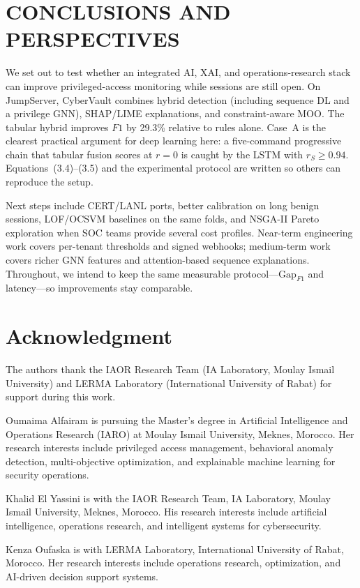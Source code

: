 \documentclass{ieeeaccess}
\begin{document}
\section{CONCLUSIONS AND PERSPECTIVES}
\label{sec:conclusion}

We set out to test whether an integrated AI, XAI, and operations-research stack can improve privileged-access monitoring while sessions are still open. On JumpServer, CyberVault combines hybrid detection (including sequence DL and a privilege GNN), SHAP/LIME explanations, and constraint-aware MOO. The tabular hybrid improves $F1$ by 29.3\% relative to rules alone. Case~A is the clearest practical argument for deep learning here: a five-command progressive chain that tabular fusion scores at $r{=}0$ is caught by the LSTM with $r_S\geq 0.94$. Equations~(3.4)--(3.5) and the experimental protocol are written so others can reproduce the setup.

Next steps include CERT/LANL ports, better calibration on long benign sessions, LOF/OCSVM baselines on the same folds, and NSGA-II Pareto exploration when SOC teams provide several cost profiles. Near-term engineering work covers per-tenant thresholds and signed webhooks; medium-term work covers richer GNN features and attention-based sequence explanations. Throughout, we intend to keep the same measurable protocol---$\mathrm{Gap}_{F1}$ and latency---so improvements stay comparable.

\section*{Acknowledgment}
The authors thank the IAOR Research Team (IA Laboratory, Moulay Ismail University) and LERMA Laboratory (International University of Rabat) for support during this work.

\nocite{*}




\newpage
\begin{IEEEbiography}{Oumaima Alfairam}
is pursuing the Master's degree in Artificial Intelligence and Operations Research (IARO) at Moulay Ismail University, Meknes, Morocco. Her research interests include privileged access management, behavioral anomaly detection, multi-objective optimization, and explainable machine learning for security operations.
\end{IEEEbiography}

\begin{IEEEbiography}{Khalid El Yassini}
is with the IAOR Research Team, IA Laboratory, Moulay Ismail University, Meknes, Morocco. His research interests include artificial intelligence, operations research, and intelligent systems for cybersecurity.
\end{IEEEbiography}

\begin{IEEEbiography}{Kenza Oufaska}
is with LERMA Laboratory, International University of Rabat, Morocco. Her research interests include operations research, optimization, and AI-driven decision support systems.
\end{IEEEbiography}

\EOD
\end{document}
